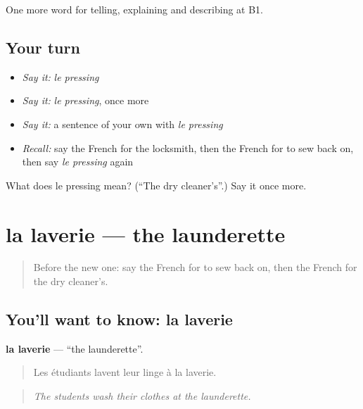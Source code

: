 \begin{grammarlens}[title={What you've built}]
One more word for telling, explaining and describing at B1.
\end{grammarlens}

\subsection*{Your turn}
\begin{itemize}
\raggedright
  \item \emph{Say it:} \emph{le pressing}
  \item \emph{Say it:} \emph{le pressing}, once more
  \item \emph{Say it:} a sentence of your own with \emph{le pressing}
  \item \emph{Recall:} say the French for the locksmith, then the French for to sew back on, then say \emph{le pressing} again
\end{itemize}

\begin{tcolorbox}[breakable,colback=teal!4,colframe=teal!35!black,title={Before you move on}]
What does le pressing mean? (\textquotedblleft{}The dry cleaner’s\textquotedblright{}.) Say it once more.
\end{tcolorbox}
\section[la laverie]{la laverie — the launderette}

\label{lesson:FR-C447-laverie}



\begin{quote}
Before the new one: say the French for to sew back on, then the French for the dry cleaner’s.
\end{quote}

\subsection*{You'll want to know: la laverie}
\textbf{la laverie} — \textquotedblleft{}the launderette\textquotedblright{}.

\begin{quote}
Les étudiants lavent leur linge à la laverie.
\end{quote}

\begin{quote}
\emph{The students wash their clothes at the launderette.}
\end{quote}

